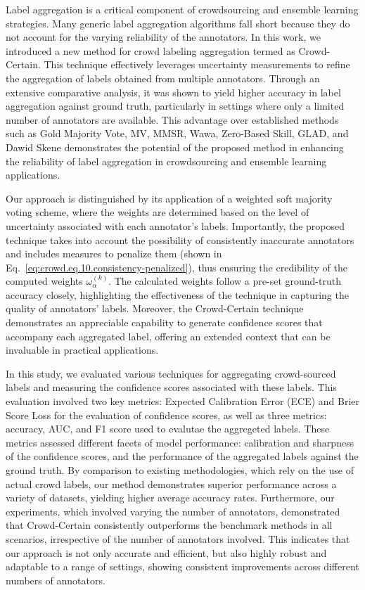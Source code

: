 Label aggregation is a critical component of crowdsourcing and ensemble learning strategies. Many generic label aggregation algorithms fall short because they do not account for the varying reliability of the annotators. In this work, we introduced a new method for crowd labeling aggregation termed as Crowd-Certain. This technique effectively leverages uncertainty measurements to refine the aggregation of labels obtained from multiple annotators. Through an extensive comparative analysis, it was shown to yield higher accuracy in label aggregation against ground truth, particularly in settings where only a limited number of annotators are available. This advantage over established methods such as Gold Majority Vote, MV, MMSR, Wawa, Zero-Based Skill, GLAD, and Dawid Skene demonstrates the potential of the proposed method in enhancing the reliability of label aggregation in crowdsourcing and ensemble learning applications.

Our approach is distinguished by its application of a weighted soft majority voting scheme, where the weights are determined based on the level of uncertainty associated with each annotator's labels. Importantly, the proposed technique takes into account the possibility of consistently inaccurate annotators and includes measures to penalize them (shown in Eq.~\ref{eq:crowd.eq.10.consistency-penalized}), thus ensuring the credibility of the computed weights $\omega_{\alpha}^{(k)}$. The calculated weights follow a pre-set ground-truth accuracy closely, highlighting the effectiveness of the technique in capturing the quality of annotators' labels. Moreover, the Crowd-Certain technique demonstrates an appreciable capability to generate confidence scores that accompany each aggregated label, offering an extended context that can be invaluable in practical applications.

In this study, we evaluated various techniques for aggregating crowd-sourced labels and measuring the confidence scores associated with these labels. This evaluation involved two key metrics: Expected Calibration Error (ECE) and Brier Score Loss for the evaluation of confidence scores, as well as three metrics: accuracy, AUC, and F1 score used to evalutae the aggregeted labels. These metrics assessed different facets of model performance: calibration and sharpness of the confidence scores, and the performance of the aggregated labels against the ground truth. By comparison to existing methodologies, which rely on the use of actual crowd labels, our method demonstrates superior performance across a variety of datasets, yielding higher average accuracy rates. Furthermore, our experiments, which involved varying the number of annotators, demonstrated that Crowd-Certain consistently outperforms the benchmark methods in all scenarios, irrespective of the number of annotators involved. This indicates that our approach is not only accurate and efficient, but also highly robust and adaptable to a range of settings, showing consistent improvements across different numbers of annotators.

